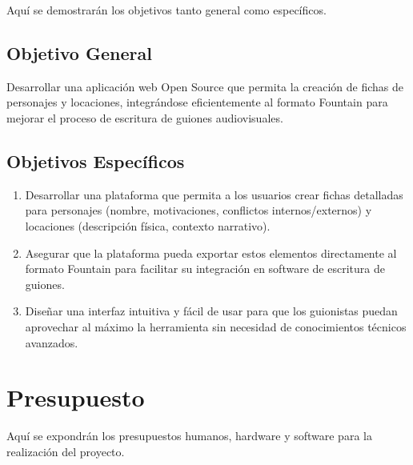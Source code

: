 \documentclass[12pt]{article}
\begin{document}
	Aquí se demostrarán los objetivos tanto general como específicos.

	\subsection*{Objetivo General}
	Desarrollar una aplicación web Open Source que permita la creación de fichas de personajes y locaciones, integrándose eficientemente al formato Fountain para mejorar el proceso de escritura de guiones audiovisuales.

	\subsection*{Objetivos Específicos}
	\begin{enumerate}
		\item Desarrollar una plataforma que permita a los usuarios crear fichas detalladas para personajes (nombre, motivaciones, conflictos internos/externos) y locaciones (descripción física, contexto narrativo).
		\item Asegurar que la plataforma pueda exportar estos elementos directamente al formato Fountain para facilitar su integración en software de escritura de guiones.
		\item Diseñar una interfaz intuitiva y fácil de usar para que los guionistas puedan aprovechar al máximo la herramienta sin necesidad de conocimientos técnicos avanzados.
	\end{enumerate}

	\clearpage

	\section*{Presupuesto}

	\hspace{1.27cm}Aquí se expondrán los presupuestos humanos, hardware y software para la realización del proyecto.
\end{document}
